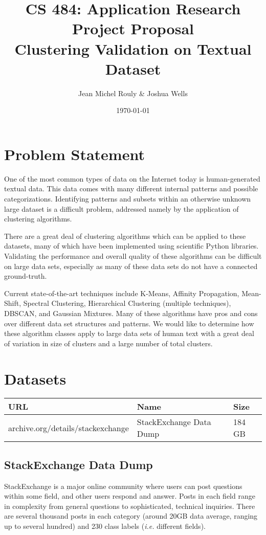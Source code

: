\documentclass[letterpaper,10pt]{article}
\title{
  \LARGE CS 484: Application Research Project Proposal \\
  \Huge Clustering Validation on Textual Dataset \\
}
\author{Jean Michel Rouly \& Joshua Wells }
\date{\today}
\begin{document}
\maketitle

\section{Problem Statement}

One of the most common types of data on the Internet today is
human-generated textual data. This data comes with many different internal
patterns and possible categorizations. Identifying patterns and subsets
within an otherwise unknown large dataset is a difficult problem, addressed
namely by the application of clustering algorithms.

There are a great deal of clustering algorithms which can be applied to
these datasets, many of which have been implemented using scientific Python
libraries. Validating the performance and overall quality of these
algorithms can be difficult on large data sets, especially as many of these
data sets do not have a connected ground-truth.

Current state-of-the-art techniques include K-Means, Affinity Propagation,
Mean-Shift, Spectral Clustering, Hierarchical Clustering (multiple
techniques), DBSCAN, and Gaussian Mixtures. Many of these algorithms have
pros and cons over different data set structures and patterns.  We would
like to determine how these algorithm classes apply to large data sets of
human text with a great deal of variation in size of clusters and a large
number of total clusters.


\section{Datasets}

\begin{tabular}{lll}
\textbf{URL} & \textbf{Name} & \textbf{Size} \\
\hline
archive.org/details/stackexchange  & StackExchange Data Dump & 184 GB \\
\end{tabular}

\subsection{StackExchange Data Dump}

StackExchange is a major online community where users can post questions
within some field, and other users respond and answer. Posts in each field
range in complexity from general questions to sophisticated, technical
inquiries. There are several thousand posts in each category (around 20GB
data average, ranging up to several hundred) and 230 class labels
(\textit{i.e.} different fields).
\end{document}
